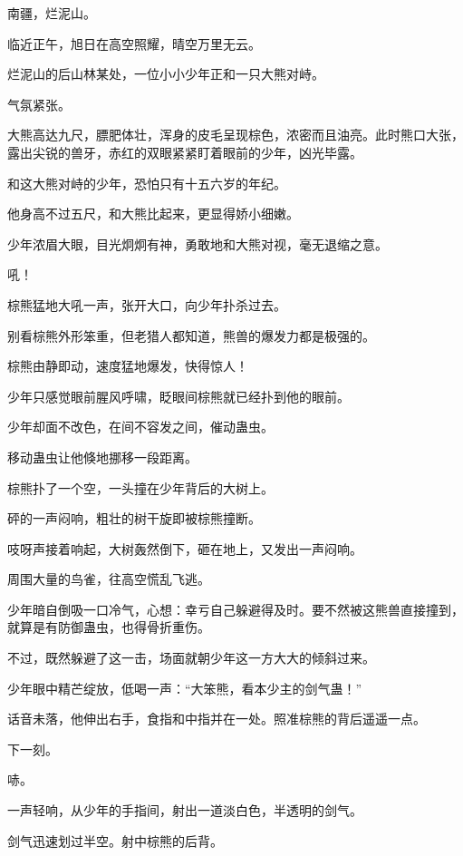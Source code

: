 
\begin{this_body}

南疆，烂泥山。

临近正午，旭日在高空照耀，晴空万里无云。

烂泥山的后山林某处，一位小小少年正和一只大熊对峙。

气氛紧张。

大熊高达九尺，膘肥体壮，浑身的皮毛呈现棕色，浓密而且油亮。此时熊口大张，露出尖锐的兽牙，赤红的双眼紧紧盯着眼前的少年，凶光毕露。

和这大熊对峙的少年，恐怕只有十五六岁的年纪。

他身高不过五尺，和大熊比起来，更显得娇小细嫩。

少年浓眉大眼，目光炯炯有神，勇敢地和大熊对视，毫无退缩之意。

吼！

棕熊猛地大吼一声，张开大口，向少年扑杀过去。

别看棕熊外形笨重，但老猎人都知道，熊兽的爆发力都是极强的。

棕熊由静即动，速度猛地爆发，快得惊人！

少年只感觉眼前腥风呼啸，眨眼间棕熊就已经扑到他的眼前。

少年却面不改色，在间不容发之间，催动蛊虫。

移动蛊虫让他倏地挪移一段距离。

棕熊扑了一个空，一头撞在少年背后的大树上。

砰的一声闷响，粗壮的树干旋即被棕熊撞断。

吱呀声接着响起，大树轰然倒下，砸在地上，又发出一声闷响。

周围大量的鸟雀，往高空慌乱飞逃。

少年暗自倒吸一口冷气，心想：幸亏自己躲避得及时。要不然被这熊兽直接撞到，就算是有防御蛊虫，也得骨折重伤。

不过，既然躲避了这一击，场面就朝少年这一方大大的倾斜过来。

少年眼中精芒绽放，低喝一声：“大笨熊，看本少主的剑气蛊！”

话音未落，他伸出右手，食指和中指并在一处。照准棕熊的背后遥遥一点。

下一刻。

哧。

一声轻响，从少年的手指间，射出一道淡白色，半透明的剑气。

剑气迅速划过半空。射中棕熊的后背。


\end{this_body}
